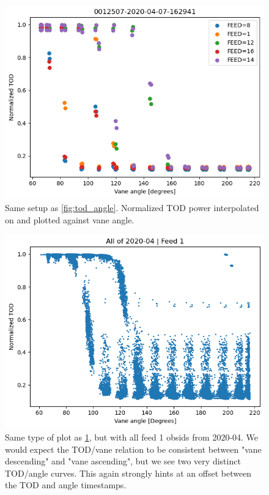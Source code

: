 \documentclass[10pt, a4paper]{article}
\begin{document}
\begin{figure}[h!]
    \centering
    \includegraphics[scale=0.6]{../power_angle_single.png}
    \caption{Same setup as \ref{fig:tod_angle}. Normalized TOD power interpolated on and plotted against vane angle.}
    \label{fig:power_angle_single}
\end{figure}


\begin{figure}[h!]
    \centering
    \includegraphics[scale=0.6]{../power_angle_all.png}
    \caption{Same type of plot as \ref{fig:power_angle_single}, but with all feed 1 obsids from 2020-04. We would expect the TOD/vane relation to be consistent between "vane descending" and "vane ascending", but we see two very distinct TOD/angle curves. This again strongly hints at an offset between the TOD and angle timestamps.}
    \label{}
\end{figure}
\end{document}
